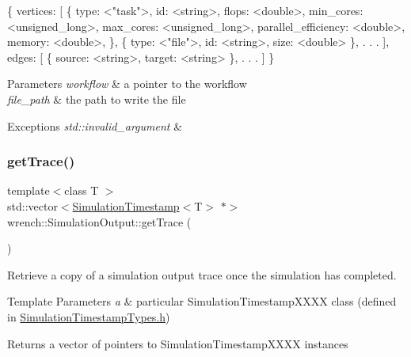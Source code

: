 \begin{DoxyPre}
\{
     vertices: [
         \{
             type: <"task">,
             id: <string>,
             flops: <double>,
             min\_cores: <unsigned\_long>,
             max\_cores: <unsigned\_long>,
             parallel\_efficiency: <double>,
             memory: <double>,
         \},
         \{
             type: <"file">,
             id: <string>,
             size: <double>
         \}, . . .
     ],
     edges: [
         \{
             source: <string>,
             target: <string>
         \}, . . .
     ]
 \}
 \end{DoxyPre}



\begin{DoxyParams}{Parameters}
{\em workflow} & a pointer to the workflow \\
\hline
{\em file\+\_\+path} & the path to write the file\\
\hline
\end{DoxyParams}

\begin{DoxyExceptions}{Exceptions}
{\em std\+::invalid\+\_\+argument} & \\
\hline
\end{DoxyExceptions}
\mbox{\label{classwrench_1_1_simulation_output_a1d03324f34db985d0e181e42cf30cd9d}} 
\subsubsection{\texorpdfstring{get\+Trace()}{getTrace()}}
{\footnotesize\ttfamily template$<$class T $>$ \\
std\+::vector$<$\hyperlink{classwrench_1_1_simulation_timestamp}{Simulation\+Timestamp}$<$T$>$ $\ast$$>$ wrench\+::\+Simulation\+Output\+::get\+Trace (\begin{DoxyParamCaption}{ }\end{DoxyParamCaption})\hspace{0.3cm}{\ttfamily [inline]}}



Retrieve a copy of a simulation output trace once the simulation has completed. 


\begin{DoxyTemplParams}{Template Parameters}
{\em a} & particular Simulation\+Timestamp\+X\+X\+XX class (defined in \hyperlink{_simulation_timestamp_types_8h_source}{Simulation\+Timestamp\+Types.\+h}) \\
\hline
\end{DoxyTemplParams}
\begin{DoxyReturn}{Returns}
a vector of pointers to Simulation\+Timestamp\+X\+X\+XX instances 
\end{DoxyReturn}


